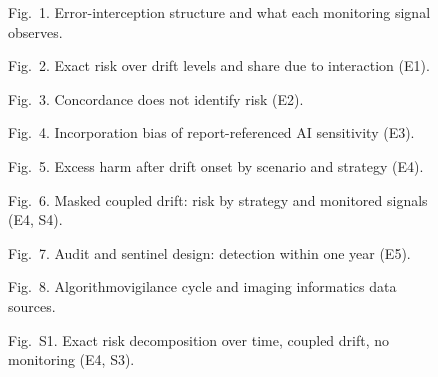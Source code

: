 \documentclass[a4paper]{article}
\newcommand{\fig}[2]{\begin{figure}[p]\centering\resizebox{\linewidth}{!}{}\caption*{\small #2}\end{figure}\clearpage}
\begin{document}
\fig{fig1_framework}{Fig.~1. Error-interception structure and what each monitoring signal observes.}
\fig{fig2_landscape}{Fig.~2. Exact risk over drift levels and share due to interaction (E1).}
\fig{fig3_identifiability}{Fig.~3. Concordance does not identify risk (E2).}
\fig{fig4_incorporation}{Fig.~4. Incorporation bias of report-referenced AI sensitivity (E3).}
\fig{fig5_excess}{Fig.~5. Excess harm after drift onset by scenario and strategy (E4).}
\fig{fig6_timecourse}{Fig.~6. Masked coupled drift: risk by strategy and monitored signals (E4, S4).}
\fig{fig7_audit}{Fig.~7. Audit and sentinel design: detection within one year (E5).}
\fig{fig8_cycle}{Fig.~8. Algorithmovigilance cycle and imaging informatics data sources.}
\fig{figS1_decomposition}{Fig.~S1. Exact risk decomposition over time, coupled drift, no monitoring (E4, S3).}
\end{document}
